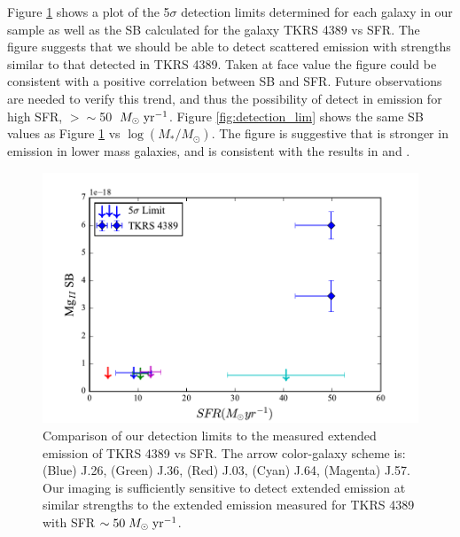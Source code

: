 \documentclass[twocolumn]{aastex61}
\def \msunperyr {{\; M_{\odot}\rm \;yr^{-1}}}
\begin{document}
Figure \ref{fig:SFR_lim} shows a plot of the 5$\sigma$ detection limits determined for each galaxy in our sample as well as the SB calculated for the galaxy TKRS 4389 vs SFR. The figure suggests that we should be able to detect scattered  emission with strengths similar to that detected in TKRS 4389. Taken at face value the figure could be consistent with a positive correlation between  SB and SFR. Future observations are needed to verify this trend, and thus the possibility of detect  in emission for high SFR, $>\sim$50 $\msunperyr$. Figure \ref{fig:detection_lim} shows the same SB values as Figure \ref{fig:SFR_lim} vs $\log(M_*/M_{\odot})$. The figure is suggestive that  is stronger in emission in lower mass galaxies, and is consistent with the results in \cite{Erb2012} and \cite{Feltre2018}.

\begin{figure}[!htb]
\centering
\includegraphics[scale=0.6]{../Figures/limits.pdf}
\caption{Comparison of our detection limits to the measured extended emission of TKRS 4389 vs SFR. The arrow color-galaxy scheme is: (Blue) J.26, (Green) J.36, (Red) J.03, (Cyan) J.64, (Magenta) J.57. Our imaging is sufficiently sensitive to detect extended emission at similar strengths to the extended emission measured for TKRS 4389 with SFR $\sim 50 \msunperyr$.}
\label{fig:SFR_lim}
\end{figure}
\end{document}
